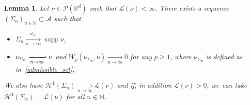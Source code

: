 \documentclass[11pt]{article}
\numberwithin{equation}{section}
\newtheorem{lemma}[theorem]{Lemma}
\theoremstyle{definition}
\newcommand\cH{\mathcal{H}}
\newcommand{\RR}{\mathbb{R}}
\DeclareMathOperator{\supp}{supp}
\newcommand{\distH}{d_{\mathcal{H}}}
\begin{document}
\begin{lemma}
\label{lemma.approximation_lemma}
Let $\nu \!\in\! \mathcal{P}(\RR^d)$ such that $\mathcal{L}(\nu) \!<\! \infty$. There exists a sequence $\left(\Sigma_n\right)_{n \in \mathbb{N}} \!\subset\! \mathcal{A}$ such that
\begin{itemize}
\item $\Sigma_n \xrightarrow[n \to \infty]{\distH} \supp \nu$,
\item $\nu_{\Sigma_n} \xrightharpoonup[n \to \infty]{} \nu$ and $W_p(\nu_{\Sigma_n}, \nu) \xrightarrow[n \to \infty]{} 0$ for any $p \ge 1$, where $\nu_{\Sigma_n}$ is defined as in~\eqref{admissible_set}.
\end{itemize}
We also have $\cH^1(\Sigma_n) \xrightarrow[n \to \infty]{} \mathcal{L}(\nu)$ and if, in addition $\mathcal{L}(\nu) > 0$, we~can take $\cH^1(\Sigma_n) = \mathcal{L}(\nu)$ for all $n \in \mathbb{N}$.
\end{lemma}
\end{document}
